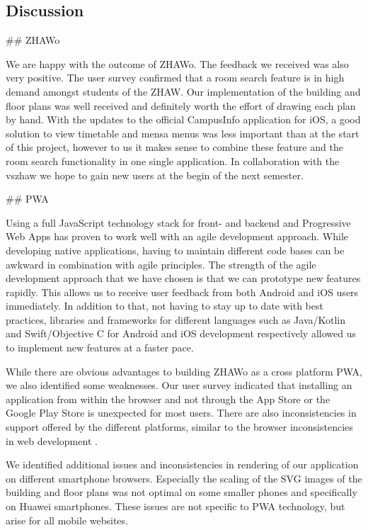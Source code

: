 \begin{markdown}
\section{Discussion} \label{discussion}

## ZHAWo

We are happy with the outcome of ZHAWo. The feedback we received was also very positive.
The user survey confirmed that a room search feature is in high demand amongst students of the ZHAW. Our implementation of the building and floor plans was well received and definitely worth the effort of drawing each plan by hand. With the updates to the official CampusInfo application for iOS, a good solution to view timetable and mensa menus was less important than at the start of this project, however to us it makes sense to combine these feature and the room search functionality in one single application. In collaboration with the vszhaw we hope to gain new users at the begin of the next semester.

## PWA

Using a full JavaScript technology stack for front- and backend and Progressive Web Apps has proven to work well with an agile development approach. While developing native applications, having to maintain different code bases can be awkward in combination with agile principles. The strength of the agile development approach that we have chosen is that we can prototype new features rapidly. This allows us to receive user feedback from both Android and iOS users immediately. In addition to that, not having to stay up to date with best practices, libraries and frameworks for different languages such as Java/Kotlin and Swift/Objective C for Android and iOS development respectively allowed us to implement new features at a faster pace.

While there are obvious advantages to building ZHAWo as a cross platform PWA, we also identified some weaknesses. Our user survey indicated that installing an application from within the browser and not through the App Store or the Google Play Store is unexpected for most users. There are also inconsistencies in support offered by the different platforms, similar to the browser inconsistencies in web development \cite{PWACurrentState}.

We identified additional issues and inconsistencies in rendering of our application on different smartphone browsers. Especially the scaling of the SVG images of the building and floor plans was not optimal on some smaller phones and specifically on Huawei smartphones. These issues are not specific to PWA technology, but arise for all mobile websites.


\end{markdown}
